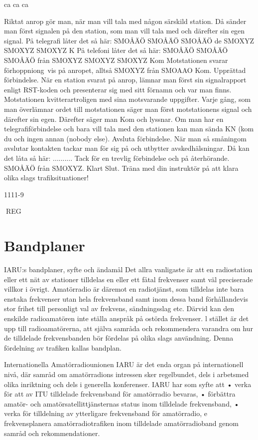ca ca ca

Riktat anrop gör man, när man vill tala med
någon särskild station. Då sänder man först
signalen på den station, som man vill tala
med och därefter sin egen signal.
På telegrafi låter det så här:
SMOÅÄÖ SMOÅÄÖ SMOÅÄÖ de SMOXYZ
SMOXYZ SMOXYZ K
På telefoni låter det så här:
SMOÅÄÖ SMOÅÄÖ SMOÅÄÖ från SMOXYZ
SMOXYZ SMOXYZ Kom
Motstationen svarar förhoppniong~vis på
anropet, alltså SMOXYZ från SMOAAO Kom.
Upprättad förbindelse. När en station svarat
på anrop, lämnar man först sin signalrapport
enligt RST-koden och presenterar sig med
sitt förnamn och var man finns. Motstationen
kvitterartroligen med sina motsvarande uppgifter. Varje gång, som man överlämnar ordet till motstationen säger man först motstationens signal och därefter sin egen. Därefter säger man Kom och lyssnar. Om man
har en telegrafiförbindelse och bara vill tala
med den stationen kan man sända KN (kom
du och ingen annan (nobody else).
Avsluta förbindelse. När man så småningom
avslutar kontakten tackar man för sig på och
utbytter avskedhälsningar.
Då kan det låta så här:
.......... Tack för en trevlig förbindelse och på
återhörande. SMOÅÄÖ från SMOXYZ. Klart
Slut.
Träna med din instruktör på att klara olika
slags trafiksituationer!

1111-9

REG
\section{Bandplaner}
IARU:s bandplaner, syfte och ändamål
Det allra vanligaste är att en radiostation eller
ett nät av stationer tilldelas en eller ett fåtal
frekvenser samt väl preciserade villkor i övrigt. Amatörradio är däremot en radiotjänst,
som tilldelas inte bara enstaka frekvenser
utan hela frekvensband samt inom dessa
band förhållandevis stor frihet till personligt
val av frekvens, sändningsslag etc.
Därvid kan den enskilde radioamatören
inte ställa anspråk på ostörda frekvenser. l
stället är det upp till radioamatörerna, att
själva samråda och rekommendera varandra om hur de tilldelade frekvensbanden bör
fördelas på olika slags användning. Denna
fördelning av trafiken kallas bandplan.

Internationella Amatörradiounionen IARU är det enda organ på internationell
nivå, där samråd om amatörradions intressen sker regelbundet, dels i arbetsmed olika inriktning och dels i
generella konferenser.
IARU har som syfte att
• verka för att av ITU tilldelade frekvensband för amatörradio bevaras,
• förbättra amatör- och amatörsatellittjänsternas status inom tilldelade
frekvensband,
• verka för tilldelning av ytterligare
frekvensband för amatörradio,
e
frekvensplanera amatörradiotrafiken
inom tilldelade amatörradioband genom samråd och rekommendationer.

